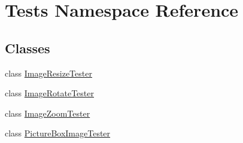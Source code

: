 \hypertarget{namespace_tests}{
\section{Tests Namespace Reference}
\label{namespace_tests}
}
\subsection*{Classes}
\begin{DoxyCompactItemize}
\item 
class \hyperlink{class_tests_1_1_image_resize_tester}{ImageResizeTester}
\item 
class \hyperlink{class_tests_1_1_image_rotate_tester}{ImageRotateTester}
\item 
class \hyperlink{class_tests_1_1_image_zoom_tester}{ImageZoomTester}
\item 
class \hyperlink{class_tests_1_1_picture_box_image_tester}{PictureBoxImageTester}
\end{DoxyCompactItemize}
